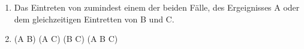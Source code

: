 \begin{enumerate}
	\item Das Eintreten von zumindest einem der beiden Fälle, des Ergeignisses A oder dem gleichzeitigen Eintretten von B und C.
	\item (A \cap B) \cup (A \cap C) \cup (B \cap C) \setminus (A \cap B \cap C)
\end{enumerate}
